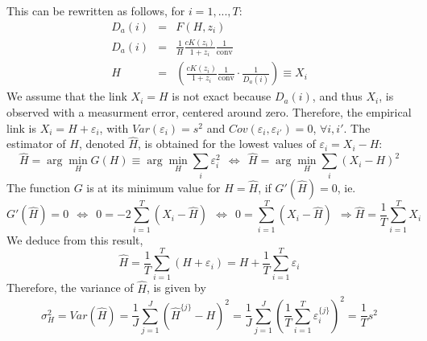 \documentclass[12pt,a4paper]{article}
\begin{document}
This can be rewritten as follows, for $i=1,...,T$:
\begin{eqnarray*}
D_a(i) &=& F(H,z_i) \\
D_a(i) &=&  \frac{1}{H} \frac{c K(z_i)}{1+z_i}\frac{1}{\text{conv}}  \\
H &=& \left( \frac{c K(z_i)}{1+z_i}\frac{1}{\text{conv}} \cdot \frac{1}{D_a(i)}\right) \equiv X_i
\end{eqnarray*}
We assume that the link $X_i = H$ is not exact because $D_a(i)$, and thus $X_i$, is observed with a measurment error, centered around zero. Therefore, the empirical link is $X_i = H+\varepsilon_i$, with $Var(\varepsilon_i) = s^2$ and $Cov(\varepsilon_i,\varepsilon_{i'}) = 0$, $\forall i,i'$. 
The estimator of $H$, denoted $\widehat{H}$, is obtained for the lowest values of $\varepsilon_i=X_i-H$:
$$
\widehat{H} = \arg \min _H G(H) \equiv \arg\min _H\sum_i \varepsilon_i^2 ~~\Leftrightarrow~~\widehat{H} = \arg\min _H \sum_i \left(X_i - H\right)^2
$$ 
The function $G$ is at its minimum value for $H=\widehat{H}$, if $G'(\widehat{H}) = 0$, ie. 
$$
G'(\widehat{H}) = 0~~ \Leftrightarrow ~~0 = -2 \sum_{i=1}^{T} \left(X_i - \widehat{H}\right)~~ \Leftrightarrow ~~0 =\sum_{i=1}^{T} \left(X_i - \widehat{H}\right)~~ \Rightarrow \widehat{H} = \frac{1}{T}\sum_{i=1}^{T} X_i
$$
We deduce from this result, 
$$
\widehat{H} = \frac{1}{T}\sum_{i=1}^{T} \left( H + \varepsilon_i \right) = H+ \frac{1}{T}\sum_{i=1}^{T}  \varepsilon_i
$$
Therefore, the variance of $\widehat{H}$, is given by
$$
\sigma_H^2 = Var(\widehat{H}) = \frac{1}{J} \sum_{j=1}^J \left( \widehat{H}^{\{j\}} - H \right)^2 = \frac{1}{J} \sum_{j=1}^J \left( \frac{1}{T}\sum_{i=1}^{T}  \varepsilon_i^{\{j\}} \right)^2  = \frac{1}{T} s^2
$$
\end{document}
